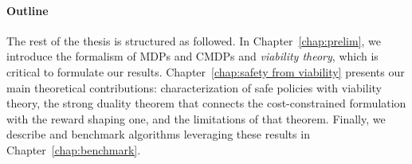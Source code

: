 	\paragraph{Outline} The rest of the thesis is structured as followed. In Chapter~\ref{chap:prelim}, we introduce the formalism of MDPs and CMDPs and\emph{ viability theory}, which is critical to formulate our results. Chapter~\ref{chap:safety from viability} presents our main theoretical contributions: characterization of safe policies with viability theory, the strong duality theorem that connects the cost-constrained formulation with the reward shaping one, and the limitations of that theorem. Finally, we describe and benchmark algorithms leveraging these results in Chapter~\ref{chap:benchmark}.